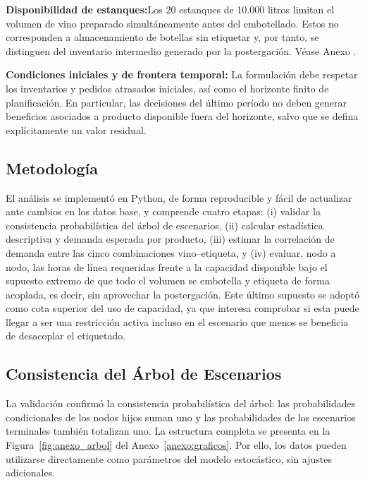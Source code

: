 \medskip
\noindent\textbf{Disponibilidad de estanques:}Los 20 estanques de 10.000 litros limitan el volumen de vino preparado
simultáneamente antes del embotellado. Estos no corresponden a almacenamiento
de botellas sin etiquetar y, por tanto, se distinguen del inventario intermedio
generado por la postergación. Véase Anexo .

\medskip
\noindent\textbf{Condiciones iniciales y de frontera temporal: }La formulación debe respetar los inventarios y pedidos atrasados iniciales, así
como el horizonte finito de planificación. En particular, las decisiones del
último período no deben generar beneficios asociados a producto disponible
fuera del horizonte, salvo que se defina explícitamente un valor residual.

 
\subsection{Metodología\label{sec:s1}}

El análisis se implementó en Python, de forma reproducible y fácil de actualizar ante cambios en los datos base, y comprende cuatro etapas: (i) validar la consistencia probabilística del árbol de escenarios, (ii) calcular estadística descriptiva y demanda esperada por producto, (iii) estimar la correlación de demanda entre las cinco combinaciones vino--etiqueta, y (iv) evaluar, nodo a nodo, las horas de línea requeridas frente a la capacidad disponible bajo el supuesto extremo de que todo el volumen se embotella y etiqueta de forma acoplada, es decir, sin aprovechar la postergación. Este último supuesto se adoptó como cota superior del uso de capacidad, ya que interesa comprobar si esta puede llegar a ser una restricción activa incluso en el escenario que menos se beneficia de desacoplar el etiquetado.

\subsection{Consistencia del Árbol de Escenarios\label{sec:s2}}

La validación confirmó la consistencia probabilística del árbol: las
probabilidades condicionales de los nodos hijos suman uno y las probabilidades de los escenarios terminales también totalizan uno. La estructura completa se presenta en la Figura~\ref{fig:anexo_arbol} del
Anexo~\ref{anexo:graficos}. Por ello, los datos pueden utilizarse directamente como parámetros del modelo estocástico, sin ajustes adicionales.




